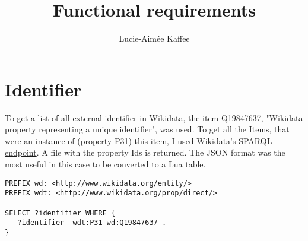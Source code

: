 \documentclass[11pt]{article}
\title {{Functional requirements}}
\author {Lucie-Aim\'{e}e Kaffee}
\date{}
\begin{document}
\section{Identifier}

To get a list of all external identifier in Wikidata, the item Q19847637, "Wikidata property representing a unique identifier", was used. To get all the Items, that were an instance of (property P31) this item, I used  \href{https://query.wikidata.org}{Wikidata's SPARQL endpoint}. A file with the property Ids is returned. The JSON format was the most useful in this case to be converted to a Lua table. \\

\begin{lstlisting}[frame=single] 
PREFIX wd: <http://www.wikidata.org/entity/>
PREFIX wdt: <http://www.wikidata.org/prop/direct/>

SELECT ?identifier WHERE {
   ?identifier  wdt:P31 wd:Q19847637 . 
}
\end{lstlisting}
\end{document}
